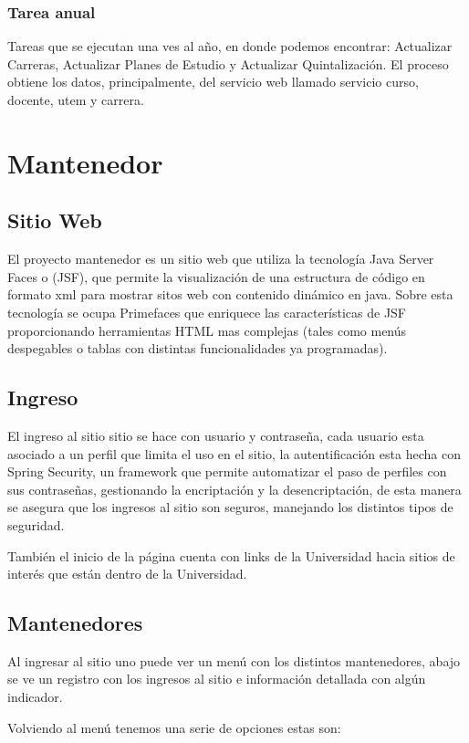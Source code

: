 \documentclass[a4paper,12pt,openany,oneside]{book}
\begin{document}
\subsection{Tarea anual}
Tareas que se ejecutan una ves al año, en donde podemos encontrar: Actualizar Carreras, Actualizar Planes de Estudio y Actualizar Quintalización. El proceso obtiene los datos, principalmente, del servicio web llamado servicio curso, docente, utem y carrera.

\chapter{Mantenedor}
\thispagestyle{empty}
\section{Sitio Web}
El proyecto mantenedor es un sitio web que utiliza la tecnología Java Server Faces o (JSF), que permite la visualización de una estructura de código en formato xml para mostrar sitos web con contenido dinámico en java. Sobre esta tecnología se ocupa Primefaces que enriquece las características de JSF proporcionando herramientas HTML mas complejas (tales como menús despegables o tablas con distintas funcionalidades ya programadas).
\section{Ingreso}
El ingreso al sitio sitio se hace con usuario y contraseña, cada usuario esta asociado a un perfil que limita el uso en el sitio, la autentificación esta hecha con Spring Security, un framework que permite automatizar el paso de perfiles con sus contraseñas, gestionando la encriptación y la desencriptación, de esta manera se asegura que los ingresos al sitio son seguros, manejando los distintos tipos de seguridad.

También el inicio de la página cuenta con links de la Universidad hacia sitios de interés que están dentro de la Universidad.
\section{Mantenedores}
Al ingresar al sitio uno puede ver un menú con los distintos mantenedores, abajo se ve un registro con los ingresos al sitio e información detallada con algún indicador.

Volviendo al menú tenemos una serie de opciones estas son:
\end{document}

